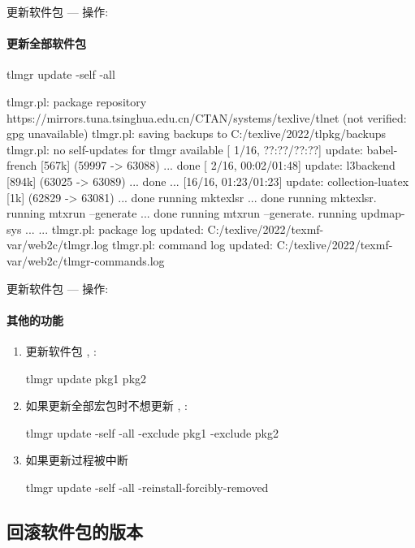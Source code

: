 \begin{frame}[fragile]{更新软件包 --- 操作: }
\framesubtitle{更新全部软件包}

\begin{cmdcode}
tlmgr update -self -all
\end{cmdcode}
\begin{outputcode}
tlmgr.pl: package repository https://mirrors.tuna.tsinghua.edu.cn/CTAN/systems/texlive/tlnet (not verified: gpg unavailable)
tlmgr.pl: saving backups to C:/texlive/2022/tlpkg/backups
tlmgr.pl: no self-updates for tlmgr available
[ 1/16, ??:??/??:??] update: babel-french [567k] (59997 -> 63088) ... done
[ 2/16, 00:02/01:48] update: l3backend [894k] (63025 -> 63089) ... done
...
[16/16, 01:23/01:23] update: collection-luatex [1k] (62829 -> 63081) ... done
running mktexlsr ...
done running mktexlsr.
running mtxrun --generate ...
done running mtxrun --generate.
running updmap-sys ...
...
tlmgr.pl: package log updated: C:/texlive/2022/texmf-var/web2c/tlmgr.log
tlmgr.pl: command log updated: C:/texlive/2022/texmf-var/web2c/tlmgr-commands.log
\end{outputcode}
\end{frame}

\begin{frame}[fragile]{更新软件包 --- 操作: }
\framesubtitle{其他的功能}
\begin{enumerate}
\item 更新软件包 , :
\begin{cmdcode}
tlmgr update pkg1 pkg2
\end{cmdcode}
\item 如果更新全部宏包时不想更新 , :
\begin{cmdcode}
tlmgr update -self -all -exclude pkg1 -exclude pkg2
\end{cmdcode}
\item 如果更新过程被中断
\begin{cmdcode}
tlmgr update -self -all -reinstall-forcibly-removed
\end{cmdcode}
\end{enumerate}
\end{frame}


\subsection{回滚软件包的版本}

